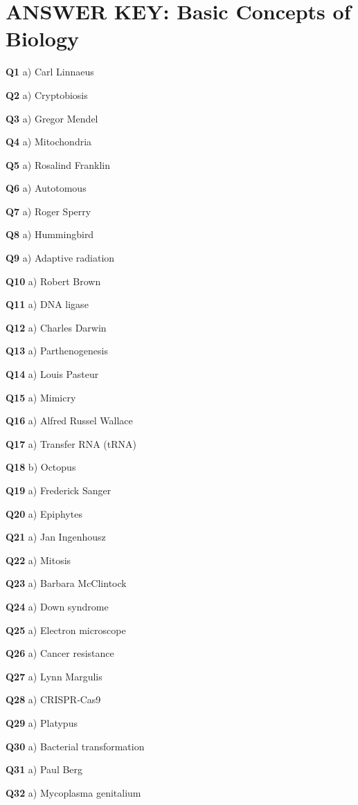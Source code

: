 \section{ANSWER KEY: Basic Concepts of Biology}

\textbf{Q1} a) Carl Linnaeus\par
\textbf{Q2} a) Cryptobiosis\par
\textbf{Q3} a) Gregor Mendel\par
\textbf{Q4} a) Mitochondria\par
\textbf{Q5} a) Rosalind Franklin\par
\textbf{Q6} a) Autotomous\par
\textbf{Q7} a) Roger Sperry\par
\textbf{Q8} a) Hummingbird\par
\textbf{Q9} a) Adaptive radiation\par
\textbf{Q10} a) Robert Brown\par
\textbf{Q11} a) DNA ligase\par
\textbf{Q12} a) Charles Darwin\par
\textbf{Q13} a) Parthenogenesis\par
\textbf{Q14} a) Louis Pasteur\par
\textbf{Q15} a) Mimicry\par
\textbf{Q16} a) Alfred Russel Wallace\par
\textbf{Q17} a) Transfer RNA (tRNA)\par
\textbf{Q18} b) Octopus\par
\textbf{Q19} a) Frederick Sanger\par
\textbf{Q20} a) Epiphytes\par
\textbf{Q21} a) Jan Ingenhousz\par
\textbf{Q22} a) Mitosis\par
\textbf{Q23} a) Barbara McClintock\par
\textbf{Q24} a) Down syndrome\par
\textbf{Q25} a) Electron microscope\par
\textbf{Q26} a) Cancer resistance\par
\textbf{Q27} a) Lynn Margulis\par
\textbf{Q28} a) CRISPR‑Cas9\par
\textbf{Q29} a) Platypus\par
\textbf{Q30} a) Bacterial transformation\par
\textbf{Q31} a) Paul Berg\par
\textbf{Q32} a) Mycoplasma genitalium\par
